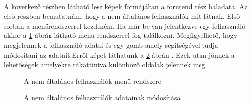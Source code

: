 \documentclass{article}
\begin{document}
	\paragraph{}
	A következő részben látható lesz képek formájában a forntend rész haladata. Az első részben bemutatnám, hogy a nem általános felhasználók mit látnak. Első sorban a menürendszerrel kezdeném. Ha már be van jelentkezve egy felhasználó akkor a \ref{fig:drawbar} ábrán látható menü rendszerrel fog találkozni. Megfigyelhető, hogy megjelennek a felhasználó adatai és egy gomb amely segítségével tudja módosítani az adatait.Erről képet láthatunk a \ref{fig:changedata} ábrán . Ezek után jönnek a lehetőségek amelyekre rákattintva különböző oldalak jelennek meg.
	\begin{figure}
		\centering
		\caption{A nem általános felhasználók menü rendszere}
		\label{fig:drawbar}
	\end{figure}
	\begin{figure}
		\centering
		\caption{A nem általános felhasználók adatainak módosítása}
		\label{fig:changedata}
	\end{figure}
	
\end{document}

